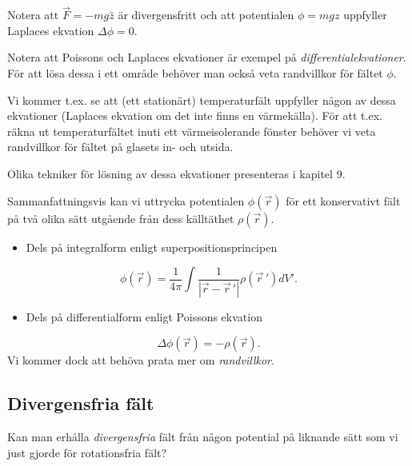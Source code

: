 \documentclass[%
oneside,                 %
final,                   %
10pt]{article}
\newenvironment{warning_mdfboxadmon}[1][]{
\begin{warning_mdfboxmdframed}[frametitle=#1]
}
{
\end{warning_mdfboxmdframed}
}
\begin{document}
\begin{warning_mdfboxadmon}[Kommentar]
Notera att $\vec{F} = -m g \hat{z}$ är divergensfritt och att potentialen $\phi = m g z$ uppfyller Laplaces ekvation $\Delta \phi = 0$.
\end{warning_mdfboxadmon} %



Notera att Poissons och Laplaces ekvationer är exempel på \emph{differentialekvationer}. För att lösa dessa i ett område behöver man också veta randvillkor för fältet $\phi$. 

Vi kommer t.ex. se att (ett stationärt) temperaturfält uppfyller någon av dessa ekvationer (Laplaces ekvation om det inte finns en värmekälla). För att t.ex. räkna ut temperaturfältet inuti ett värmeisolerande fönster behöver vi veta randvillkor för fältet på glasets in- och utsida.

Olika tekniker för lösning av dessa ekvationer presenteras i kapitel 9.


\begin{warning_mdfboxadmon}
Sammanfattningsvis kan vi uttrycka potentialen $\phi(\vec{r})$ för ett konservativt fält på två olika sätt utgående från dess källtäthet $\rho(\vec{r})$. 
\begin{itemize}
\item Dels på integralform enligt superpositionsprincipen
\end{itemize}

\noindent
\[
\phi(\vec{r}) = \frac{1}{4\pi} \int \frac{1}{\left| \vec{r} - \vec{r}\,' \right|} \rho(\vec{r}\,') dV'.
\] 
\begin{itemize}
\item Dels på differentialform enligt Poissons ekvation
\end{itemize}

\noindent
\[
\Delta \phi(\vec{r}) = -\rho(\vec{r}).
\]
Vi kommer dock att behöva prata mer om \emph{randvillkor}.
\end{warning_mdfboxadmon} %




\subsection*{Divergensfria fält}

Kan man erhålla \emph{divergensfria} fält från någon potential på liknande sätt som vi just gjorde för rotationsfria fält?
\end{document}
